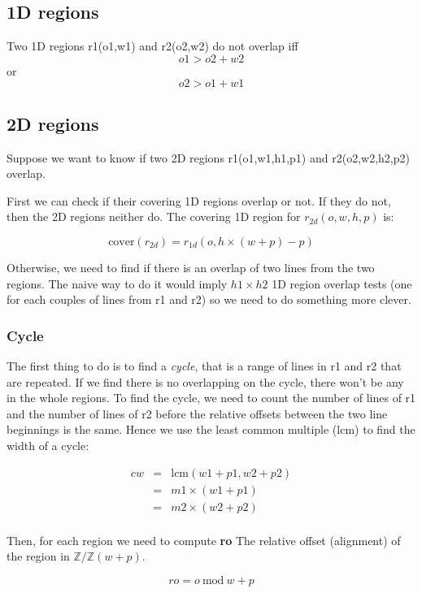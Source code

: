 \documentclass[twocolumn]{article}
\begin{document}
\subsection{1D regions}

Two 1D regions r1(o1,w1) and r2(o2,w2) do not overlap iff 
\[ o1 > o2+w2 \] or \[o2 > o1 + w1 \]

\subsection{2D regions}

Suppose we want to know if two 2D regions r1(o1,w1,h1,p1) and r2(o2,w2,h2,p2)
overlap.

First we can check if their covering 1D regions overlap or not. If they do not,
then the 2D regions neither do. The covering 1D region for $r_{2d}(o,w,h,p)$ is:

\[ \textrm{cover}(r_{2d}) = r_{1d}(o, h \times (w + p) - p) \]

Otherwise, we need to find if there is an overlap of two lines from the two
regions. The naive way to do it would imply $h1 \times h2$ 1D region overlap
tests (one for each couples of lines from r1 and r2) so we need to do something
more clever.

\subsubsection{Cycle}

The first thing to do is to find a \emph{cycle}, that is a range of lines in r1
and r2 that are repeated. If we find there is no overlapping on the cycle, there
won't be any in the whole regions. To find the cycle, we need to count the number
of lines of r1 and the number of lines of r2 before the relative offsets between
the two line beginnings is the same. Hence we use the least common multiple
(lcm) to find the width of a cycle:

\[
\begin{array}{rcl}
cw &=& \textrm{lcm} (w1+p1,w2+p2) \\
   &=& m1 \times (w1 + p1) \\ 
   &=& m2 \times (w2 + p2) \\
\end{array}
\]

Then, for each region we need to compute \textbf{ro} The relative offset
(alignment) of the region in $\mathbb{Z}/\mathbb{Z}(w+p)$.

\[ ro  = o\ \textrm{mod}\ w + p \]
\end{document}
